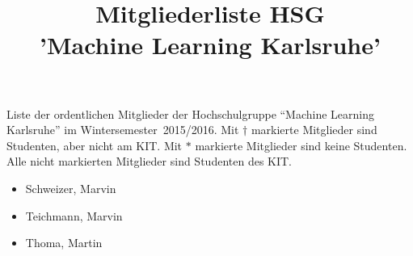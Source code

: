 \documentclass[a4paper]{scrartcl}
\title{Mitgliederliste HSG\\'Machine Learning Karlsruhe'}
\author{}
\begin{document}
\maketitle

Liste der ordentlichen Mitglieder der Hochschulgruppe \enquote{Machine Learning
Karlsruhe} im Wintersemester~2015/2016. Mit $\dagger$ markierte Mitglieder
sind Studenten, aber nicht am KIT. Mit $\ast$ markierte Mitglieder sind keine
Studenten. Alle nicht markierten Mitglieder sind Studenten des KIT.

\begin{itemize}
    \item Schweizer, Marvin
    \item Teichmann, Marvin
    \item Thoma, Martin
\end{itemize}
\end{document}
